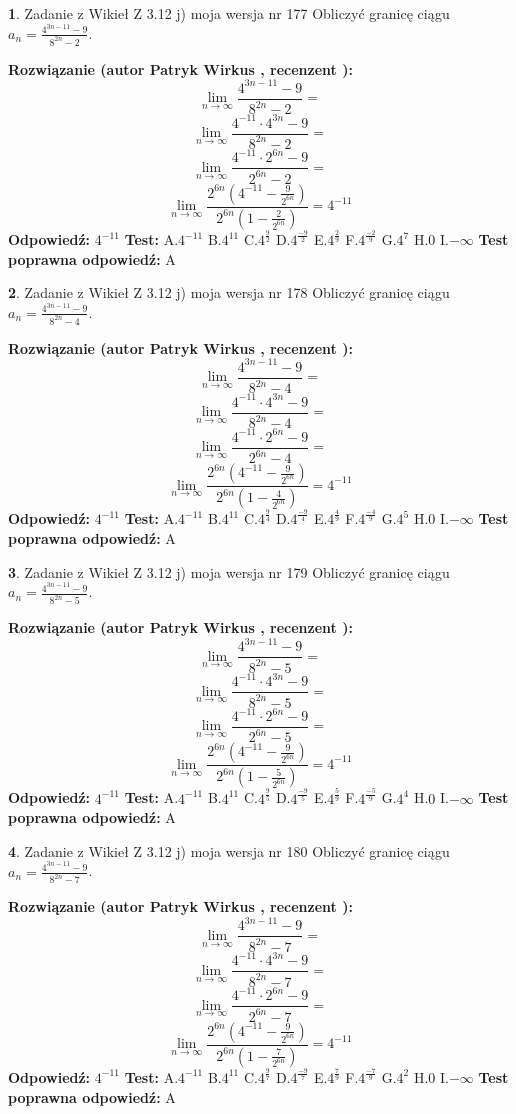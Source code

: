 \documentclass[12pt, a4paper]{article}
\theoremstyle{definition} %
\newtheorem{zad}{}
\newcommand{\zadStart}[1]{\begin{zad}#1\newline}
\newcommand{\zadStop}{\end{zad}}
\newcommand{\rozwStart}[2]{\noindent \textbf{Rozwiązanie (autor #1 , recenzent #2): }\newline}
\newcommand{\rozwStop}{\newline}
\newcommand{\odpStart}{\noindent \textbf{Odpowiedź:}\newline}
\newcommand{\odpStop}{\newline}
\newcommand{\testStart}{\noindent \textbf{Test:}\newline}
\newcommand{\testStop}{\newline}
\newcommand{\kluczStart}{\noindent \textbf{Test poprawna odpowiedź:}\newline}
\newcommand{\kluczStop}{\newline}
\begin{document}
\zadStart{Zadanie z Wikieł Z 3.12 j) moja wersja nr 177}
Obliczyć granicę ciągu $a_{n}=\frac{4^{3n-11}-9}{8^{2n}-2}$.
\zadStop
\rozwStart{Patryk Wirkus}{}
$$\lim\limits_{n\to\infty}\frac{4^{3n-11}-9}{8^{2n}-2}=$$
$$\lim\limits_{n\to\infty}\frac{4^{-11} \cdot 4^{3n}-9}{8^{2n}-2}=$$
$$\lim\limits_{n\to\infty}\frac{4^{-11} \cdot 2^{6n}-9}{2^{6n}-2}=$$
$$\lim\limits_{n\to\infty}\frac{2^{6n}(4^{-11} - \frac{9}{2^{6n}})}{2^{6n}(1-\frac{2}{2^{6n}})}= 4^{-11}$$
\rozwStop
\odpStart
$4^{-11}$
\odpStop
\testStart
A.$4^{-11}$
B.$4^{11}$
C.$4^{\frac{9}{2}}$
D.$4^{\frac{-9}{2}}$
E.$4^{\frac{2}{9}}$
F.$4^{\frac{-2}{9}}$
G.$4^{7}$
H.$0$
I.$-\infty$
\testStop
\kluczStart
A
\kluczStop



\zadStart{Zadanie z Wikieł Z 3.12 j) moja wersja nr 178}
Obliczyć granicę ciągu $a_{n}=\frac{4^{3n-11}-9}{8^{2n}-4}$.
\zadStop
\rozwStart{Patryk Wirkus}{}
$$\lim\limits_{n\to\infty}\frac{4^{3n-11}-9}{8^{2n}-4}=$$
$$\lim\limits_{n\to\infty}\frac{4^{-11} \cdot 4^{3n}-9}{8^{2n}-4}=$$
$$\lim\limits_{n\to\infty}\frac{4^{-11} \cdot 2^{6n}-9}{2^{6n}-4}=$$
$$\lim\limits_{n\to\infty}\frac{2^{6n}(4^{-11} - \frac{9}{2^{6n}})}{2^{6n}(1-\frac{4}{2^{6n}})}= 4^{-11}$$
\rozwStop
\odpStart
$4^{-11}$
\odpStop
\testStart
A.$4^{-11}$
B.$4^{11}$
C.$4^{\frac{9}{4}}$
D.$4^{\frac{-9}{4}}$
E.$4^{\frac{4}{9}}$
F.$4^{\frac{-4}{9}}$
G.$4^{5}$
H.$0$
I.$-\infty$
\testStop
\kluczStart
A
\kluczStop



\zadStart{Zadanie z Wikieł Z 3.12 j) moja wersja nr 179}
Obliczyć granicę ciągu $a_{n}=\frac{4^{3n-11}-9}{8^{2n}-5}$.
\zadStop
\rozwStart{Patryk Wirkus}{}
$$\lim\limits_{n\to\infty}\frac{4^{3n-11}-9}{8^{2n}-5}=$$
$$\lim\limits_{n\to\infty}\frac{4^{-11} \cdot 4^{3n}-9}{8^{2n}-5}=$$
$$\lim\limits_{n\to\infty}\frac{4^{-11} \cdot 2^{6n}-9}{2^{6n}-5}=$$
$$\lim\limits_{n\to\infty}\frac{2^{6n}(4^{-11} - \frac{9}{2^{6n}})}{2^{6n}(1-\frac{5}{2^{6n}})}= 4^{-11}$$
\rozwStop
\odpStart
$4^{-11}$
\odpStop
\testStart
A.$4^{-11}$
B.$4^{11}$
C.$4^{\frac{9}{5}}$
D.$4^{\frac{-9}{5}}$
E.$4^{\frac{5}{9}}$
F.$4^{\frac{-5}{9}}$
G.$4^{4}$
H.$0$
I.$-\infty$
\testStop
\kluczStart
A
\kluczStop



\zadStart{Zadanie z Wikieł Z 3.12 j) moja wersja nr 180}
Obliczyć granicę ciągu $a_{n}=\frac{4^{3n-11}-9}{8^{2n}-7}$.
\zadStop
\rozwStart{Patryk Wirkus}{}
$$\lim\limits_{n\to\infty}\frac{4^{3n-11}-9}{8^{2n}-7}=$$
$$\lim\limits_{n\to\infty}\frac{4^{-11} \cdot 4^{3n}-9}{8^{2n}-7}=$$
$$\lim\limits_{n\to\infty}\frac{4^{-11} \cdot 2^{6n}-9}{2^{6n}-7}=$$
$$\lim\limits_{n\to\infty}\frac{2^{6n}(4^{-11} - \frac{9}{2^{6n}})}{2^{6n}(1-\frac{7}{2^{6n}})}= 4^{-11}$$
\rozwStop
\odpStart
$4^{-11}$
\odpStop
\testStart
A.$4^{-11}$
B.$4^{11}$
C.$4^{\frac{9}{7}}$
D.$4^{\frac{-9}{7}}$
E.$4^{\frac{7}{9}}$
F.$4^{\frac{-7}{9}}$
G.$4^{2}$
H.$0$
I.$-\infty$
\testStop
\kluczStart
A
\kluczStop
\end{document}
